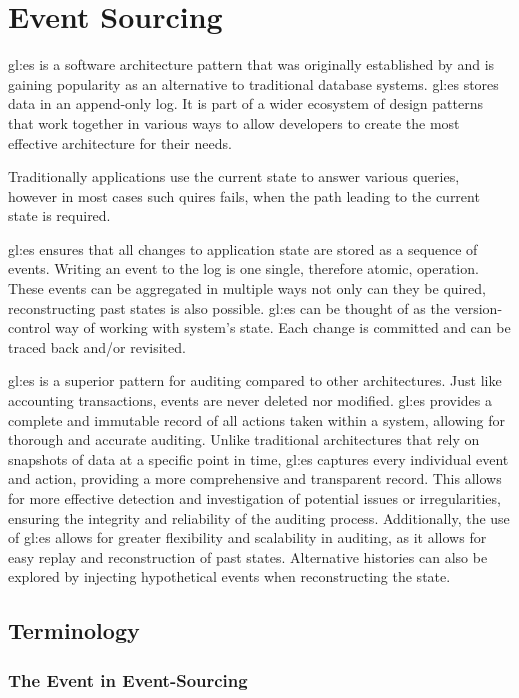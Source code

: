 %
\chapter{Event Sourcing}\label{chap:es}

\gls{gl:es} is a software architecture pattern that was originally established by \citep{fowleres} and is gaining popularity as an alternative to traditional database systems. \gls{gl:es} stores data in an append-only log. It is part of a wider ecosystem of design patterns that work together in various ways to allow developers to create the most effective architecture for their needs. 

Traditionally applications use the current state to answer various queries, however in most cases such quires fails, when the path leading to the current state is required.

\gls{gl:es} ensures that all changes to application state are stored as a sequence of events. Writing an event to the log is one single, therefore atomic, operation. These events can be aggregated in multiple ways not only can they be quired, reconstructing past states is also possible. \gls{gl:es} can be thought of as the version-control way of working with system's state. Each change is committed and can be traced back and/or revisited.

\gls{gl:es} is a superior pattern for auditing compared to other architectures. Just like accounting transactions, events are never deleted nor modified. \gls{gl:es} provides a complete and immutable record of all actions taken within a system, allowing for thorough and accurate auditing. Unlike traditional architectures that rely on snapshots of data at a specific point in time, \gls{gl:es} captures every individual event and action, providing a more comprehensive and transparent record. This allows for more effective detection and investigation of potential issues or irregularities, ensuring the integrity and reliability of the auditing process. Additionally, the use of \gls{gl:es} allows for greater flexibility and scalability in auditing, as it allows for easy replay and reconstruction of past states. Alternative histories can also be explored by injecting hypothetical events when reconstructing the state.

\section{Terminology}\label{sec:term}

\subsection{The Event in Event-Sourcing}

